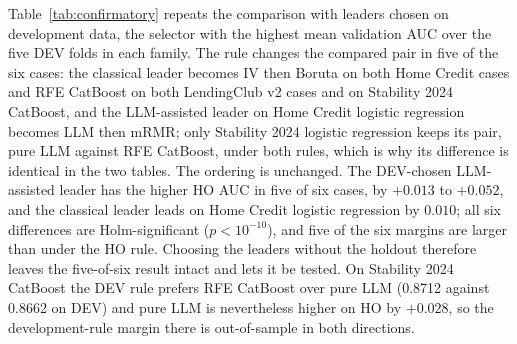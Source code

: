 \documentclass[final,5p,twocolumn]{elsarticle}
\begin{document}
Table~\ref{tab:confirmatory} repeats the comparison with leaders chosen on development data, the selector with the highest mean validation AUC over the five DEV folds in each family. The rule changes the compared pair in five of the six cases: the classical leader becomes IV then Boruta on both Home Credit cases and RFE CatBoost on both LendingClub v2 cases and on Stability 2024 CatBoost, and the LLM-assisted leader on Home Credit logistic regression becomes LLM then mRMR; only Stability 2024 logistic regression keeps its pair, pure LLM against RFE CatBoost, under both rules, which is why its difference is identical in the two tables. The ordering is unchanged. The DEV-chosen LLM-assisted leader has the higher HO AUC in five of six cases, by $+0.013$ to $+0.052$, and the classical leader leads on Home Credit logistic regression by $0.010$; all six differences are Holm-significant ($p<10^{-10}$), and five of the six margins are larger than under the HO rule. Choosing the leaders without the holdout therefore leaves the five-of-six result intact and lets it be tested. On Stability 2024 CatBoost the DEV rule prefers RFE CatBoost over pure LLM (0.8712 against 0.8662 on DEV) and pure LLM is nevertheless higher on HO by $+0.028$, so the development-rule margin there is out-of-sample in both directions.
\end{document}
